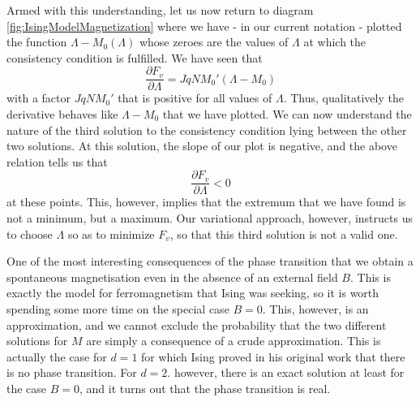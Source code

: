 \documentclass[a4paper, draft]{article}
\theoremstyle{own}
\theoremstyle{remark}
\begin{document}
Armed with this understanding, let us now return to diagram \ref{fig:IsingModelMagnetization} where we have - in our current notation - plotted the function $\Lambda - M_0(\Lambda)$ whose zeroes are the values of $\Lambda$ at which the consistency condition is fulfilled. We have seen that
$$
\frac{\partial F_v}{\partial \Lambda} = J  q N M_0' (\Lambda -   M_0) 
$$
with a factor $J q N M_0'$ that is positive for all values of $\Lambda$. Thus, qualitatively the derivative behaves like $\Lambda - M_0$ that we have plotted. We can now understand the nature of the third solution to the consistency condition lying between the other two solutions. At this solution, the slope of our plot is negative, and the above relation tells us that 
$$
\frac{\partial F_v}{\partial \Lambda} < 0
$$
at these points. This, however, implies that the extremum that we have found is not a minimum, but a maximum. Our variational approach, however, instructs us to choose $\Lambda$ so as to minimize $F_v$, so that this third solution is not a valid one. 

One of the most interesting consequences of the phase transition that we obtain a spontaneous magnetisation even in the absence of an external field $B$. This is exactly the model for ferromagnetism that Ising was seeking, so it is worth spending some more time on the special case $B = 0$. This, however, is an approximation, and we cannot exclude the probability that the two different solutions for $M$ are simply a consequence of a crude approximation. This is actually the case for $d = 1$ for which Ising proved in his original work that there is no phase transition. For $d = 2$. however, there is an exact solution at least for the case $B = 0$, and it turns out that the phase transition is real. 
\end{document}
